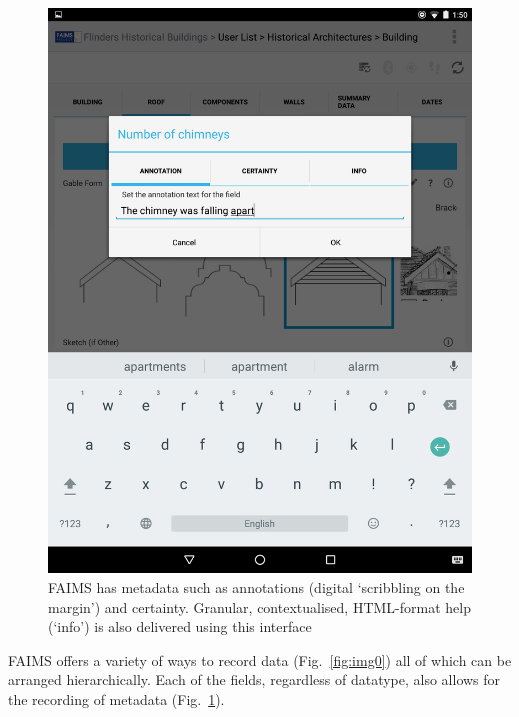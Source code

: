 \documentclass[preprint,12pt, a4paper]{elsarticle}
\begin{document}
\begin{figure}[!htb]
	\includegraphics[width=\linewidth]{image_1.png}
	\caption{FAIMS has metadata such as annotations (digital `scribbling on the margin') and certainty. Granular, contextualised, HTML-format help (`info') is also delivered using this interface}
	\label{fig:img1}
\endminipage\hfill

\end{figure}

FAIMS offers a variety of ways to record data (Fig.~\ref{fig:img0}) all of which can be arranged hierarchically. Each of the fields, regardless of datatype, also allows for the recording of metadata (Fig.~\ref{fig:img1}).
\end{document}
